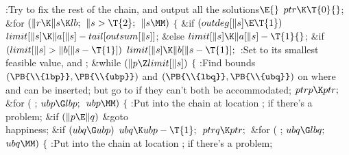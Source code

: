 \B{}:Try to fix the rest of the chain, and output all the solutions\X${}%
\E{}$\6
$\\{ptr}\K\T{0}{}$;\6
\&{for} ${}(\|r\K\|s\K\\{lb};{}$ ${}\|s>\T{2};{}$ ${}\|s\MM){}$\5
${}\{{}$\1\6
\&{if} ${}(\\{outdeg}[\|s]\E\T{1}){}$\1\5
${}\\{limit}[\|s]\K\|a[\|s]-\\{tail}[\\{outsum}[\|s]]{}$;\5
\2\&{else}\1\5
${}\\{limit}[\|s]\K\|a[\|s]-\T{1}{}$;\2\6
\&{if} ${}(\\{limit}[\|s]>\|b[\|s-\T{1}]){}$\1\5
${}\\{limit}[\|s]\K\|b[\|s-\T{1}];{}$\2\6
:Set  to its smallest feasible value, and %
\X;\6
\&{while} ${}(\|p\Z\\{limit}[\|s]){}$\5
${}\{{}$\1\6
:Find bounds $(\PB{\\{lbp}},\PB{\\{ubp}})$ and $(\PB{\\{lbq}},\PB{%
\\{ubq}})$ on where  and  can be inserted; but go to  if they can't both be accommodated\X;\6
${}\\{ptrp}\K\\{ptr};{}$\6
\&{for} ( ; ${}\\{ubp}\G\\{lbp};{}$ ${}\\{ubp}\MM){}$\5
${}\{{}$\1\6
:Put  into the chain at location ;  if there's a problem\X;\6
\&{if} ${}(\|p\E\|q){}$\1\5
\&{goto} \\{happiness};\2\6
\&{if} ${}(\\{ubq}\G\\{ubp}){}$\1\5
${}\\{ubq}\K\\{ubp}-\T{1};{}$\2\6
${}\\{ptrq}\K\\{ptr};{}$\6
\&{for} ( ; ${}\\{ubq}\G\\{lbq};{}$ ${}\\{ubq}\MM){}$\5
${}\{{}$\1\6
:Put  into the chain at location ;  if there's a problem\X;\6
